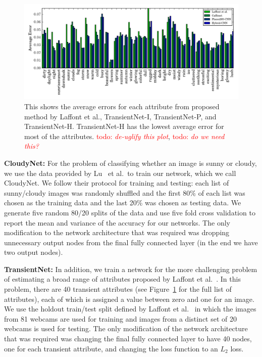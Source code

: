 \documentclass[10pt,twocolumn,letterpaper]{article}
\newcommand{\todo}[1]{\textcolor{red}{todo: {\em #1}}}
\newcommand{\figref}[1]{Figure~\ref{fig:#1}}
\begin{document}
\begin{figure}[t!]
	\centering
		\includegraphics[width=1.0\textwidth, trim= 0 4mm 0 0]{figs/avg_err_compare.pdf}
		\caption{This shows the average errors for each attribute from proposed method
						 by Laffont et al., TransientNet-I, TransientNet-P, and TransientNet-H.  
             TransientNet-H has the lowest average error for most of the attributes.
             \todo{de-uglify this plot}, \todo{do we need this?}}
		\label{fig:compare}
\end{figure}

\textbf{CloudyNet:} For the problem of classifying whether an image is sunny or
cloudy, we use the data provided by Lu~\cite{lutwoclass} et al.\ to train our
network, which we call CloudyNet.  We follow their protocol for training and
testing: each list of sunny/cloudy images was randomly shuffled and the first
80\% of each list was chosen as the training data and the last 20\% was chosen
as testing data.  We generate five random 80/20 splits of the data and use five
fold cross validation to report the mean and variance of the accuracy for our
networks.  The only modification to the network architecture that was required
was dropping unnecessary output nodes from the final fully connected layer (in
the end we have two output nodes).

\textbf{TransientNet:} In addition, we train a network for the more challenging
problem of estimating a broad range of attributes proposed by
Laffont et al.~\cite{Laffont14}.  In this problem, there are 40 transient attributes
(see \figref{compare} for the full list of attributes), each of which is
assigned a value between zero and one for an image. We use the holdout
train/test split defined by Laffont et al.~\cite{Laffont14} in which the images
from 81 webcams are used for training and images from a distinct set of 20
webcams is used for testing.  The only modification of the network architecture
that was required was changing the final fully connected layer to have 40
nodes, one for each transient attribute, and changing the loss function to an
$L_2$ loss. 
\end{document}
